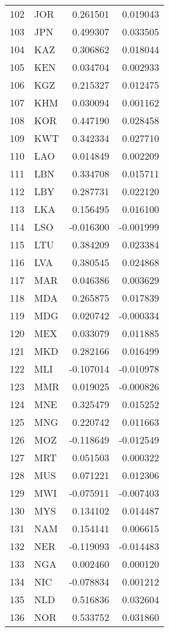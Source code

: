 \begin{tabular}{llrr}
102 & JOR & 0.261501 & 0.019043 \\
103 & JPN & 0.499307 & 0.033505 \\
104 & KAZ & 0.306862 & 0.018044 \\
105 & KEN & 0.034704 & 0.002933 \\
106 & KGZ & 0.215327 & 0.012475 \\
107 & KHM & 0.030094 & 0.001162 \\
108 & KOR & 0.447190 & 0.028458 \\
109 & KWT & 0.342334 & 0.027710 \\
110 & LAO & 0.014849 & 0.002209 \\
111 & LBN & 0.334708 & 0.015711 \\
112 & LBY & 0.287731 & 0.022120 \\
113 & LKA & 0.156495 & 0.016100 \\
114 & LSO & -0.016300 & -0.001999 \\
115 & LTU & 0.384209 & 0.023384 \\
116 & LVA & 0.380545 & 0.024868 \\
117 & MAR & 0.046386 & 0.003629 \\
118 & MDA & 0.265875 & 0.017839 \\
119 & MDG & 0.020742 & -0.000334 \\
120 & MEX & 0.033079 & 0.011885 \\
121 & MKD & 0.282166 & 0.016499 \\
122 & MLI & -0.107014 & -0.010978 \\
123 & MMR & 0.019025 & -0.000826 \\
124 & MNE & 0.325479 & 0.015252 \\
125 & MNG & 0.220742 & 0.011663 \\
126 & MOZ & -0.118649 & -0.012549 \\
127 & MRT & 0.051503 & 0.000322 \\
128 & MUS & 0.071221 & 0.012306 \\
129 & MWI & -0.075911 & -0.007403 \\
130 & MYS & 0.134102 & 0.014487 \\
131 & NAM & 0.154141 & 0.006615 \\
132 & NER & -0.119093 & -0.014483 \\
133 & NGA & 0.002460 & 0.000120 \\
134 & NIC & -0.078834 & 0.001212 \\
135 & NLD & 0.516836 & 0.032604 \\
136 & NOR & 0.533752 & 0.031860 \\

\end{tabular}
